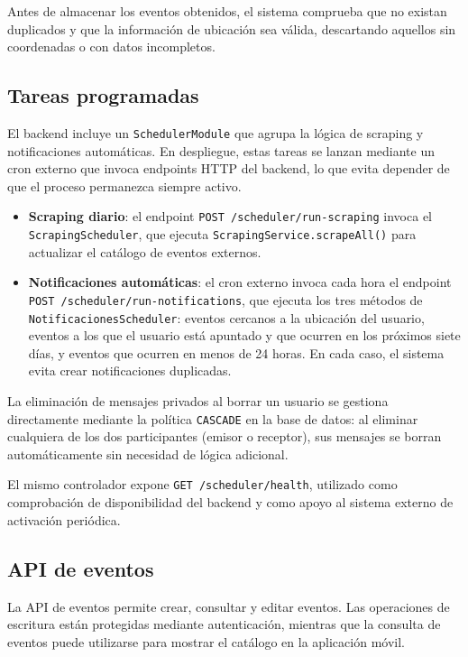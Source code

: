 Antes de almacenar los eventos obtenidos, el sistema comprueba que no existan duplicados y que la información de ubicación sea válida, descartando aquellos sin coordenadas o con datos incompletos.

\subsection{Tareas programadas}\label{sec:scheduler}

El backend incluye un \texttt{SchedulerModule} que agrupa la lógica de scraping y notificaciones automáticas. En despliegue, estas tareas se lanzan mediante un cron externo que invoca endpoints HTTP del backend, lo que evita depender de que el proceso permanezca siempre activo.

\begin{itemize}
    \item \textbf{Scraping diario}: el endpoint \texttt{POST /scheduler/run-scraping} invoca el \texttt{ScrapingScheduler}, que ejecuta \texttt{ScrapingService.scrapeAll()} para actualizar el catálogo de eventos externos.
    \item \textbf{Notificaciones automáticas}: el cron externo invoca cada hora el endpoint \texttt{POST /scheduler/run-notifications}, que ejecuta los tres métodos de \texttt{NotificacionesScheduler}: eventos cercanos a la ubicación del usuario, eventos a los que el usuario está apuntado y que ocurren en los próximos siete días, y eventos que ocurren en menos de 24 horas. En cada caso, el sistema evita crear notificaciones duplicadas.
\end{itemize}

La eliminación de mensajes privados al borrar un usuario se gestiona directamente mediante la política \texttt{CASCADE} en la base de datos: al eliminar cualquiera de los dos participantes (emisor o receptor), sus mensajes se borran automáticamente sin necesidad de lógica adicional.

El mismo controlador expone \texttt{GET /scheduler/health}, utilizado como comprobación de disponibilidad del backend y como apoyo al sistema externo de activación periódica.

\subsection{API de eventos}

La API de eventos permite crear, consultar y editar eventos. Las operaciones de escritura están protegidas mediante autenticación, mientras que la consulta de eventos puede utilizarse para mostrar el catálogo en la aplicación móvil.

